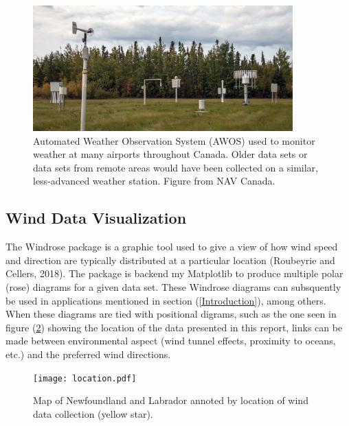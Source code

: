 \documentclass{article}
\begin{document}
\begin{figure}[h!]
\centering
\includegraphics[width=10cm]{Images/AWOS.jpg}
\caption{Automated Weather Observation System (AWOS) used to monitor weather at many airports throughout Canada. Older data sets or data sets from remote areas would have been collected on a similar, 
less-advanced weather station. Figure from NAV Canada.}
\label{AWOS}
\end{figure}

\subsection{Wind Data Visualization}\label{Wind_data_visualization}

The Windrose package is a graphic tool used to give a view of how wind speed and direction are typically distributed at a particular location (Roubeyrie and Cellers, 2018). The package is backend my 
Matplotlib to produce multiple polar (rose) diagrams for a given data set. These Windrose diagrams can subsquently be used in applications mentioned in section (\ref{Introduction}), among others. When 
these diagrams are tied with positional digrams, such as the one seen in figure (\ref{location}) showing the location of the data presented in this report, links can be made between environmental aspect 
(wind tunnel effects, proximity to oceans, etc.) and the preferred wind directions.

\begin{figure}[h!]                                                                                                                                                                                                 
\centering                                                                                                                                                                                                         
\texttt{[image: location.pdf]}                                                                                                                                                                       
\caption{Map of Newfoundland and Labrador annoted by location of wind data collection (yellow star).}                                                                                                              
\label{location}                                                                                                                                                                                                   
\end{figure}
\end{document}
